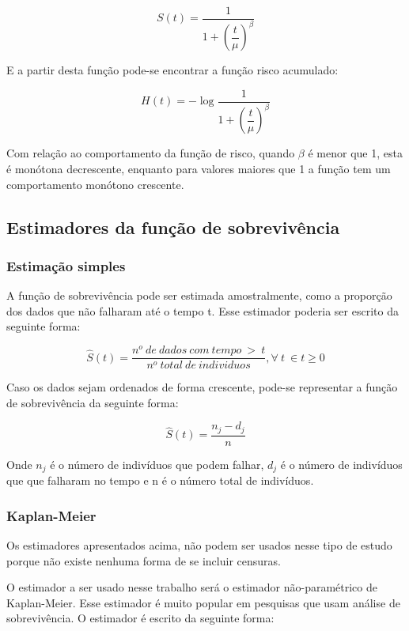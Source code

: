 \begin{equation} \label{eq: LLSurv}
  S(t) = \dfrac{1}{1 + \left(\dfrac{t}{\mu}\right)^{\beta}}
\end{equation}

E a partir desta função pode-se encontrar a função risco acumulado:

\begin{equation} \label{eq: HazLL}
H(t) = - \log{\dfrac{1}{1 + \left(\dfrac{t}{\mu}\right)^{\beta}}}
\end{equation}

Com relação ao comportamento da função de risco, quando $\beta$ é menor que 1, esta é monótona decrescente, enquanto para valores maiores que 1 a função tem um comportamento monótono crescente.

\subsection*{Estimadores da função de sobrevivência}

\subsubsection*{Estimação simples}

A função de sobrevivência pode ser estimada amostralmente, como a proporção dos dados que não falharam até o tempo t. Esse estimador poderia ser escrito da seguinte forma:

$$ \hat{S}(t) = \dfrac{n^o \ de \ dados \ com \ tempo \ > \ t}{n^o \ total \ de \ individuos}, \forall \ t \ \in t\ge 0$$

Caso os dados sejam ordenados de forma crescente, pode-se representar a função de sobrevivência da seguinte forma:

$$ \hat{S}(t) = \dfrac{n_j - d_j}{n} $$

Onde $n_j$ é o número de indivíduos que podem falhar, $d_j$ é o número de indivíduos que que falharam no tempo e n é o número total de indivíduos.

\subsubsection*{Kaplan-Meier}

Os estimadores apresentados acima, não podem ser usados nesse tipo de estudo porque não existe nenhuma forma de se incluir censuras.

O estimador a ser usado nesse trabalho será o estimador não-paramétrico de Kaplan-Meier. Esse estimador é muito popular em pesquisas que usam análise de sobrevivência. O estimador é escrito da seguinte forma:

